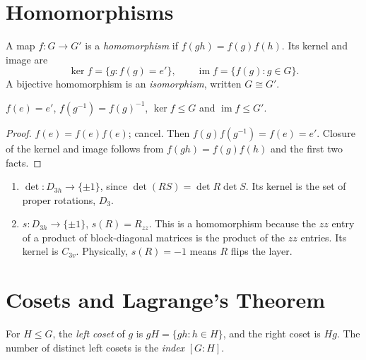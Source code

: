 \section{Homomorphisms}

\begin{definition}[Homomorphism]
A map $f:G\to G'$ is a \emph{homomorphism} if $f(gh) = f(g)f(h)$. Its kernel and image are
\[
    \ker f = \{g : f(g) = e'\},\qquad \operatorname{im}f = \{f(g): g\in G\}.
\]
A bijective homomorphism is an \emph{isomorphism}, written $G\cong G'$.
\end{definition}

\begin{theorem}
$f(e) = e'$, $f(g^{-1}) = f(g)^{-1}$, $\ker f\le G$ and $\operatorname{im} f\le G'$.
\end{theorem}
\begin{proof}
$f(e) = f(e)f(e)$; cancel. Then $f(g)f(g^{-1}) = f(e) = e'$. Closure of the kernel and image follows from $f(gh) = f(g)f(h)$ and the first two facts.
\end{proof}

\begin{example}
\leavevmode
\begin{enumerate}
    \item $\det: D_{3h}\to\{\pm1\}$, since $\det(RS) = \det R\det S$. Its kernel is the set of proper rotations, $D_3$.
    \item $s: D_{3h}\to\{\pm1\}$, $s(R) = R_{zz}$. This is a homomorphism because the $zz$ entry of a product of block-diagonal matrices is the product of the $zz$ entries. Its kernel is $C_{3v}$. Physically, $s(R) = -1$ means $R$ flips the layer.
\end{enumerate}
\end{example}

\section{Cosets and Lagrange's Theorem}

\begin{definition}
For $H\le G$, the \emph{left coset} of $g$ is $gH = \{gh : h\in H\}$, and the right coset is $Hg$. The number of distinct left cosets is the \emph{index} $[G:H]$.
\end{definition}

